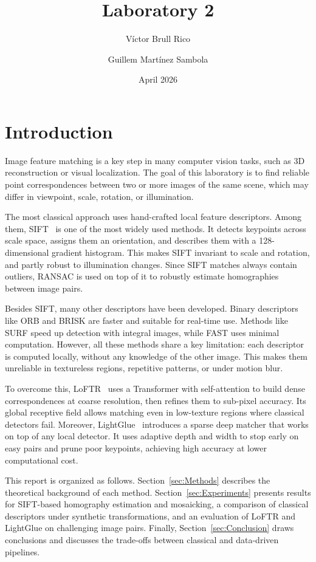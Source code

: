 \documentclass{article}
\title{Laboratory 2}
\author{Víctor Brull Rico\and
        Guillem Martínez Sambola}
\date{April 2026}
\begin{document}
\maketitle

\section{Introduction}

Image feature matching is a key step in many computer vision tasks, such as
3D reconstruction or visual localization. The goal of this laboratory is to 
find reliable point correspondences between two or more images of the 
same scene, which may differ in viewpoint, scale, rotation, or illumination.

The most classical approach uses hand-crafted local feature descriptors. Among
them, SIFT~\cite{Lowe2004} is one of the most widely used methods. It detects
keypoints across scale space, assigns them an orientation, and describes them
with a 128-dimensional gradient histogram. This makes SIFT invariant to scale
and rotation, and partly robust to illumination changes. Since SIFT matches
always contain outliers, RANSAC is used on top of it to robustly estimate
homographies between image pairs.

Besides SIFT, many other descriptors have been developed. Binary descriptors
like ORB and BRISK are faster and suitable for real-time use. Methods like SURF
speed up detection with integral images, while FAST uses minimal computation.
However, all these methods share a key limitation: each descriptor is computed
locally, without any knowledge of the other image. This makes them unreliable
in textureless regions, repetitive patterns, or under motion blur.

To overcome this, LoFTR~\cite{Sun2021} uses a Transformer with self-attention 
to build dense correspondences at coarse resolution, then refines them to sub-pixel
accuracy. Its global receptive field allows matching even in low-texture regions
where classical detectors fail. Moreover, LightGlue~\cite{Lindenberger2023}
introduces a sparse deep matcher that works on top of any local detector. It
uses adaptive depth and width to stop early on easy pairs and prune poor
keypoints, achieving high accuracy at lower computational cost.

This report is organized as follows. Section~\ref{sec:Methods} describes the
theoretical background of each method. Section~\ref{sec:Experiments} presents
results for SIFT-based homography estimation and mosaicking, a comparison of
classical descriptors under synthetic transformations, and an evaluation of
LoFTR and LightGlue on challenging image pairs. Finally, Section~\ref{sec:Conclusion} 
draws conclusions and discusses the trade-offs between classical and data-driven pipelines.
\end{document}
